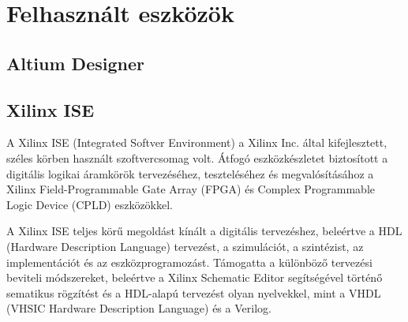\chapter{Felhasznált eszközök}

\section{Altium Designer}

\section{Xilinx ISE}

A Xilinx ISE (Integrated Softver Environment) a Xilinx Inc. által kifejlesztett, széles körben használt szoftvercsomag volt. Átfogó eszközkészletet biztosított a digitális logikai áramkörök tervezéséhez, teszteléséhez és megvalósításához a Xilinx Field-Programmable Gate Array (FPGA) és Complex Programmable Logic Device (CPLD) eszközökkel.

A Xilinx ISE teljes körű megoldást kínált a digitális tervezéshez, beleértve a HDL (Hardware Description Language) tervezést, a szimulációt, a szintézist, az implementációt és az eszközprogramozást. Támogatta a különböző tervezési beviteli módszereket, beleértve a Xilinx Schematic Editor segítségével történő sematikus rögzítést és a HDL-alapú tervezést olyan nyelvekkel, mint a VHDL (VHSIC Hardware Description Language) és a Verilog.